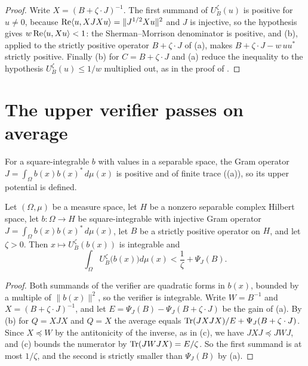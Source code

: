 \begin{proof}
\leanok
{}
Write $X = (B + \zeta \cdot J)^{-1}$. The first summand of $U_B^{\zeta}(u)$ is positive
for $u \neq 0$, because $\operatorname{Re} \langle u, X J X u \rangle = \|J^{1/2} X u\|^2$ and $J$ is
injective, so the hypothesis gives $w \operatorname{Re} \langle u, X u \rangle < 1$: the
Sherman--Morrison denominator is positive, and (b), applied to
the strictly positive operator $B + \zeta \cdot J$ of (a),
makes $B + \zeta \cdot J - w \, u u^*$ strictly positive. Finally
(b) for $C = B + \zeta \cdot J$ and (a) reduce the
inequality to the hypothesis $U_B^{\zeta}(u) \leq 1/w$ multiplied out, as in the proof of
.
\end{proof}

\section{The upper verifier passes on average}

For a square-integrable $b$ with values in a separable space, the Gram operator
$J = \int_\Omega b(x) b(x)^* \, d\mu(x)$ is positive and of finite trace
((a)), so its upper potential is defined.

\begin{lemma}
\label{lem:upper-verifier-on-average}
\leanok
{}
Let $(\Omega, \mu)$ be a measure space, let $H$ be a nonzero separable complex Hilbert
space, let $b : \Omega \to H$ be square-integrable with injective Gram operator
$J = \int_\Omega b(x) b(x)^* \, d\mu(x)$, let $B$ be a strictly positive operator on $H$,
and let $\zeta > 0$. Then $x \mapsto U_B^{\zeta}(b(x))$ is integrable and
\[
  \int_\Omega U_B^{\zeta} \bigl( b(x) \bigr) d\mu(x) < \frac{1}{\zeta} + \Psi_J(B).
\]
\end{lemma}

\begin{proof}
\leanok
{}
Both summands of the verifier are quadratic forms in $b(x)$, bounded by a multiple of
$\|b(x)\|^2$, so the verifier is integrable. Write $W = B^{-1}$ and
$X = (B + \zeta \cdot J)^{-1}$, and let $E = \Psi_J(B) - \Psi_J(B + \zeta \cdot J)$ be the
gain of (a). By (b) for
$Q = X J X$ and $Q = X$ the average equals
$\operatorname{Tr} (J X J X) / E + \Psi_J(B + \zeta \cdot J)$. Since $X \preceq W$ by the antitonicity of
the inverse, as in (c), we have $J X J \preceq J W J$, and
(c) bounds the numerator by $\operatorname{Tr} (J W J X) = E / \zeta$. So the
first summand is at most $1/\zeta$, and the second is strictly smaller than $\Psi_J(B)$
by (a).
\end{proof}

